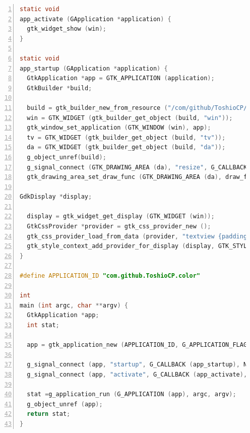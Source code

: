 \begin{lstlisting}[language=C, numbers=left]
static void
app_activate (GApplication *application) {
  gtk_widget_show (win);
}

static void
app_startup (GApplication *application) {
  GtkApplication *app = GTK_APPLICATION (application);
  GtkBuilder *build;

  build = gtk_builder_new_from_resource ("/com/github/ToshioCP/color/color.ui");
  win = GTK_WIDGET (gtk_builder_get_object (build, "win"));
  gtk_window_set_application (GTK_WINDOW (win), app);
  tv = GTK_WIDGET (gtk_builder_get_object (build, "tv"));
  da = GTK_WIDGET (gtk_builder_get_object (build, "da"));
  g_object_unref(build);
  g_signal_connect (GTK_DRAWING_AREA (da), "resize", G_CALLBACK (resize_cb), NULL);
  gtk_drawing_area_set_draw_func (GTK_DRAWING_AREA (da), draw_func, NULL, NULL);

GdkDisplay *display;

  display = gtk_widget_get_display (GTK_WIDGET (win));
  GtkCssProvider *provider = gtk_css_provider_new ();
  gtk_css_provider_load_from_data (provider, "textview {padding: 10px; font-family: monospace; font-size: 12pt;}", -1);
  gtk_style_context_add_provider_for_display (display, GTK_STYLE_PROVIDER (provider), GTK_STYLE_PROVIDER_PRIORITY_USER);
}

#define APPLICATION_ID "com.github.ToshioCP.color"

int
main (int argc, char **argv) {
  GtkApplication *app;
  int stat;

  app = gtk_application_new (APPLICATION_ID, G_APPLICATION_FLAGS_NONE);

  g_signal_connect (app, "startup", G_CALLBACK (app_startup), NULL);
  g_signal_connect (app, "activate", G_CALLBACK (app_activate), NULL);

  stat =g_application_run (G_APPLICATION (app), argc, argv);
  g_object_unref (app);
  return stat;
}
\end{lstlisting}

